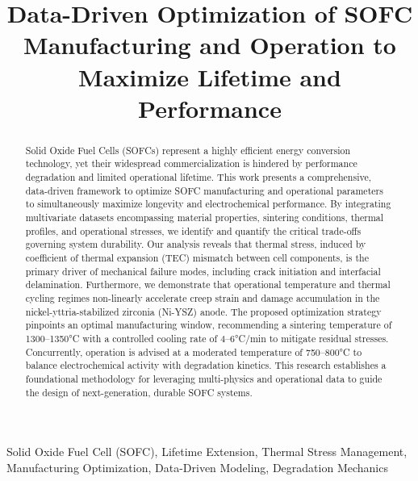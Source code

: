 \documentclass[conference]{IEEEtran}
\begin{document}
\title{Data-Driven Optimization of SOFC Manufacturing and Operation to Maximize Lifetime and Performance}

\author{
}

\maketitle

\begin{abstract}
Solid Oxide Fuel Cells (SOFCs) represent a highly efficient energy conversion technology, yet their widespread commercialization is hindered by performance degradation and limited operational lifetime. This work presents a comprehensive, data-driven framework to optimize SOFC manufacturing and operational parameters to simultaneously maximize longevity and electrochemical performance. By integrating multivariate datasets encompassing material properties, sintering conditions, thermal profiles, and operational stresses, we identify and quantify the critical trade-offs governing system durability. Our analysis reveals that thermal stress, induced by coefficient of thermal expansion (TEC) mismatch between cell components, is the primary driver of mechanical failure modes, including crack initiation and interfacial delamination. Furthermore, we demonstrate that operational temperature and thermal cycling regimes non-linearly accelerate creep strain and damage accumulation in the nickel-yttria-stabilized zirconia (Ni-YSZ) anode. The proposed optimization strategy pinpoints an optimal manufacturing window, recommending a sintering temperature of 1300–1350°C with a controlled cooling rate of 4–6°C/min to mitigate residual stresses. Concurrently, operation is advised at a moderated temperature of 750–800°C to balance electrochemical activity with degradation kinetics. This research establishes a foundational methodology for leveraging multi-physics and operational data to guide the design of next-generation, durable SOFC systems.
\end{abstract}

\begin{IEEEkeywords}
Solid Oxide Fuel Cell (SOFC), Lifetime Extension, Thermal Stress Management, Manufacturing Optimization, Data-Driven Modeling, Degradation Mechanics
\end{IEEEkeywords}
\end{document}
